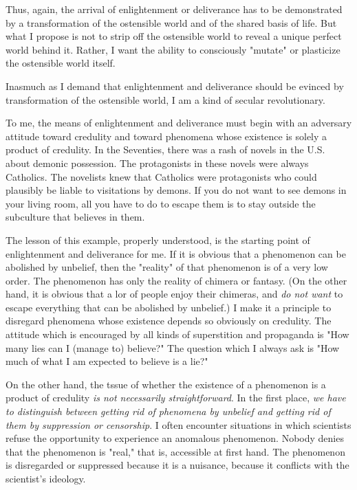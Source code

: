 Thus, again, the arrival of enlightenment or deliverance has to be demonstrated 
by a transformation of the ostensible world and of the shared basis of life. But what 
I propose is not to strip off the ostensible world to reveal a unique perfect world 
behind it. Rather, I want the ability to consciously "mutate" or plasticize the 
ostensible world itself. 

\visbreak

Inasmuch as I demand that enlightenment and deliverance should be evinced 
by transformation of the ostensible world, I am a kind of secular revolutionary. 

To me, the means of enlightenment and deliverance must begin with an adversary 
attitude toward credulity and toward phenomena whose existence is solely a 
product of credulity. In the Seventies, there was a rash of novels in the U.S. about 
demonic possession. The protagonists in these novels were always Catholics. The 
novelists knew that Catholics were protagonists who could plausibly be liable to 
visitations by demons. If you do not want to see demons in your living room, 
all you have to do to escape them is to stay outside the subculture that believes 
in them. 

The lesson of this example, properly understood, is the starting point of enlightenment 
and deliverance for me. If it is obvious that a phenomenon can be 
abolished by unbelief, then the "reality" of that phenomenon is of a very low order. 
The phenomenon has only the reality of chimera or fantasy. (On the other hand, it 
is obvious that a lor of people enjoy their chimeras, and \textit{do not want} to escape 
everything that can be abolished by unbelief.) I make it a principle to disregard 
phenomena whose existence depends so obviously on credulity. The attitude 
which is encouraged by all kinds of superstition and propaganda is "How many lies 
can I (manage to) believe?" The question which I always ask is "How much of what 
I am expected to believe is a lie?" 

On the other hand, the tssue of whether the existence of a phenomenon is 
a product of credulity \textit{is not necessarily straightforward}. In the first place, 
\textit{we have to distinguish between getting rid of phenomena by unbelief and 
getting rid of them by suppression or censorship}. I often encounter situations 
in which scientists refuse the opportunity to experience an anomalous phenomenon.
Nobody denies that the phenomenon is "real," that is, accessible at first hand. The phenomenon is 
disregarded or suppressed because it is a nuisance, because it conflicts with the 
scientist's ideology. 

